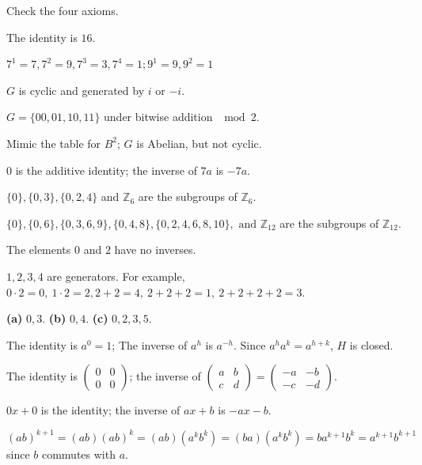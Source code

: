 \documentclass[12pt]{book}
\theoremstyle{definition}
\begin{document}
\begin{oddenumerate}
	\item Check the four axioms.
	
	\item The identity is $ 16. $
	
	\item $ 7^1=7,7^2=9, 7^3=3, 7^4=1; 9^1=9, 9^2=1 $
	
	\item $G$ is cyclic and generated by $ i $ or $ -i. $
	
	\item $ G=\{00,01,10,11\} $ under bitwise addition $\mod 2 $. 
	
	\item Mimic the table for $ B^2 $; $ G $ is Abelian, but not cyclic. 
	
	\item $ 0 $ is the additive identity; the inverse of $ 7a $ is $ -7a. $
	
	\item $ \{0\}, \{0,3\}, \{0,2,4\} $ and $ \mathbb{Z}_6 $ are the subgroups of $ \mathbb{Z}_6. $
	
	\item $ \{0\},\{0,6\}, \{0,3,6,9\}, \{0,4,8\}, \{0,2,4,6,8,10\},\text{ and } \mathbb{Z}_{12} $ are the subgroups of $\mathbb{Z}_{12}.  $
	
	\item The elements $ 0 $ and $ 2 $ have no inverses.
	
	\item $ 1,2,3,4 $ are generators. For example, $ 0\cdot 2=0,~ 1\cdot 2=2, 2+2=4,~ 2+2+2=1,~ 2+2+2+2=3. $
	
	\item \textbf{(a)} $ 0,3 $. \textbf{(b)} $ 0,4. $ \textbf{(c)} $ 0,2,3,5. $
	
	\item The identity is $ a^0=1 $; The inverse of $ a^h $ is $ a^{-h} $. Since $ a^ha^k=a^{h+k} $, $ H $ is closed. 
	
	\item The identity is $\begin{pmatrix} 0 & 0\\ 0 & 0 \end{pmatrix}$; the inverse of  $\begin{pmatrix} a & b\\ c & d \end{pmatrix}=  \begin{pmatrix} -a & -b\\ -c & -d \end{pmatrix}$.
	\item $ 0x+0 $ is the identity; the inverse of $ ax+b $ is $ -ax-b. $
	
	\item $ (ab)^{k+1}=(ab)(ab)^k=(ab)(a^kb^k)=(ba)(a^kb^k)=ba^{k+1}b^k=a^{k+1}b^{k+1} $ since $ b $ commutes with $ a $.
	
	
	
\end{oddenumerate}
\end{document}
